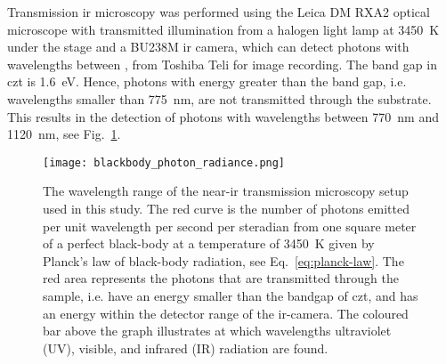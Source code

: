Transmission \ac{ir} microscopy was performed using the Leica DM RXA2 optical microscope with transmitted illumination from a halogen light lamp at \SI{3450}{\kelvin} under the stage and a BU238M \ac{ir} camera, which can detect photons with wavelengths between , from Toshiba Teli for image recording. The band gap in \ac{czt} is \SI{1.6}{\electronvolt}. Hence, photons with energy greater than the band gap, i.e. wavelengths smaller than \SI{775}{\nano\metre}, are not transmitted through the substrate. This results in the detection of photons with wavelengths between \SI{770}{\nano\metre} and \SI{1120}{\nano\metre}, see Fig.~\ref{fig:ir-range}.   %

\begin{figure}[htbp]
    \centering
    \texttt{[image: blackbody\_photon\_radiance.png]}
    \caption[Graph showing the wavelength range of the near-\ac{ir} transmission microscopy setup.]{The wavelength range of the near-\ac{ir} transmission microscopy setup used in this study. The red curve is the number of photons emitted per unit wavelength per second per steradian from one square meter of a perfect black-body at a temperature of \SI{3450}{\kelvin} given by Planck's law of black-body radiation, see Eq.~\eqref{eq:planck-law}. The red area represents the photons that are transmitted through the sample, i.e. have an energy smaller than the bandgap of \ac{czt},  and has an energy within the detector range of the \ac{ir}-camera. The coloured bar above the graph illustrates at which wavelengths ultraviolet (UV), visible, and infrared (IR) radiation are found.}
    \label{fig:ir-range}
\end{figure}

